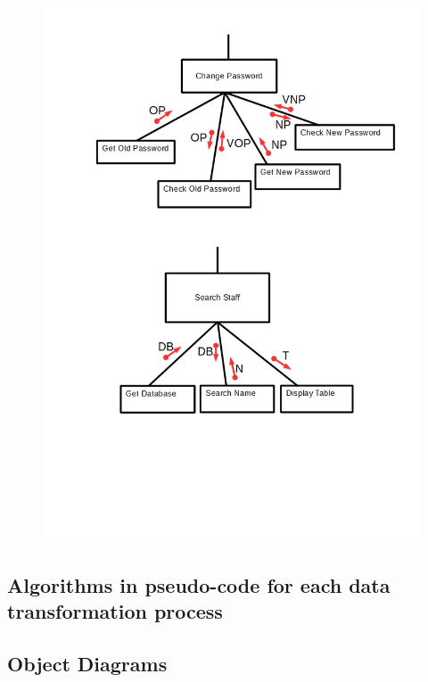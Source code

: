 \begin{figure}[H]
\includegraphics[width=\textwidth]{PS8.jpg}
\caption{}
\end{figure}

\subsection{Algorithms in pseudo-code for each data transformation process}

\subsection{Object Diagrams}

